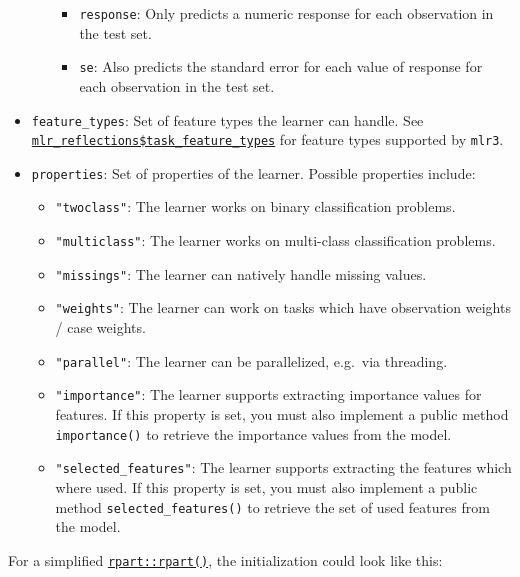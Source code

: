 \documentclass[]{article}
\providecommand{\tightlist}{%
  \setlength{\itemsep}{0pt}\setlength{\parskip}{0pt}}
\begin{document}
\begin{itemize}
\begin{itemize}
    \begin{itemize}
    \tightlist
    \item
      \texttt{response}: Only predicts a numeric response for each observation in the test set.
    \item
      \texttt{se}: Also predicts the standard error for each value of response for each observation in the test set.
    \end{itemize}
  \end{itemize}
\item
  \texttt{feature\_types}: Set of feature types the learner can handle.
  See \href{https://mlr3.mlr-org.com/reference/mlr_reflections.html}{\texttt{mlr\_reflections\$task\_feature\_types}} for feature types supported by \texttt{mlr3}.
\item
  \texttt{properties}: Set of properties of the learner. Possible properties include:

  \begin{itemize}
  \tightlist
  \item
    \texttt{"twoclass"}: The learner works on binary classification problems.
  \item
    \texttt{"multiclass"}: The learner works on multi-class classification problems.
  \item
    \texttt{"missings"}: The learner can natively handle missing values.
  \item
    \texttt{"weights"}: The learner can work on tasks which have observation weights / case weights.
  \item
    \texttt{"parallel"}: The learner can be parallelized, e.g.~via threading.
  \item
    \texttt{"importance"}: The learner supports extracting importance values for features.
    If this property is set, you must also implement a public method \texttt{importance()} to retrieve the importance values from the model.
  \item
    \texttt{"selected\_features"}: The learner supports extracting the features which where used.
    If this property is set, you must also implement a public method \texttt{selected\_features()} to retrieve the set of used features from the model.
  \end{itemize}
\end{itemize}

For a simplified \href{https://www.rdocumentation.org/packages/rpart/topics/rpart}{\texttt{rpart::rpart()}}, the initialization could look like this:
\end{document}
